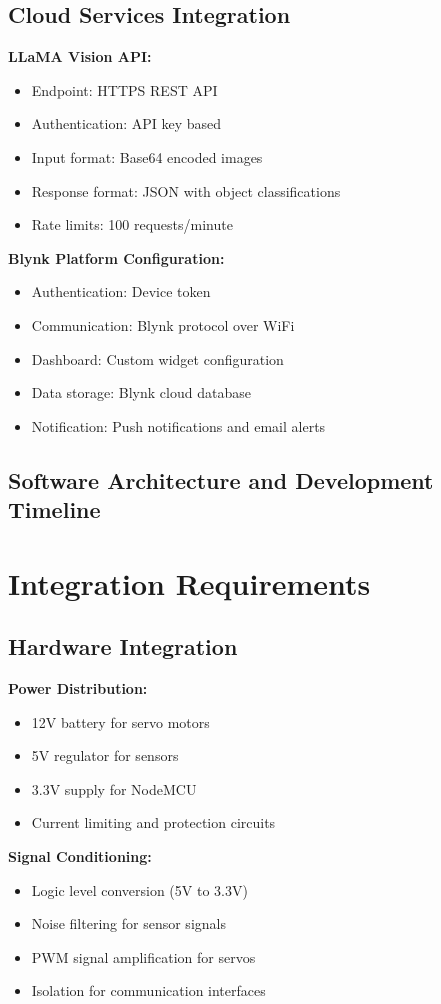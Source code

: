 \subsection{Cloud Services Integration}
\textbf{LLaMA Vision API:}
\begin{itemize}
\item Endpoint: HTTPS REST API
\item Authentication: API key based
\item Input format: Base64 encoded images
\item Response format: JSON with object classifications
\item Rate limits: 100 requests/minute
\end{itemize}

\textbf{Blynk Platform Configuration:}
\begin{itemize}
\item Authentication: Device token
\item Communication: Blynk protocol over WiFi
\item Dashboard: Custom widget configuration
\item Data storage: Blynk cloud database
\item Notification: Push notifications and email alerts
\end{itemize}

\subsection{Software Architecture and Development Timeline}

\section{Integration Requirements}

\subsection{Hardware Integration}
\textbf{Power Distribution:}
\begin{itemize}
\item 12V battery for servo motors
\item 5V regulator for sensors
\item 3.3V supply for NodeMCU
\item Current limiting and protection circuits
\end{itemize}

\textbf{Signal Conditioning:}
\begin{itemize}
\item Logic level conversion (5V to 3.3V)
\item Noise filtering for sensor signals
\item PWM signal amplification for servos
\item Isolation for communication interfaces
\end{itemize}

